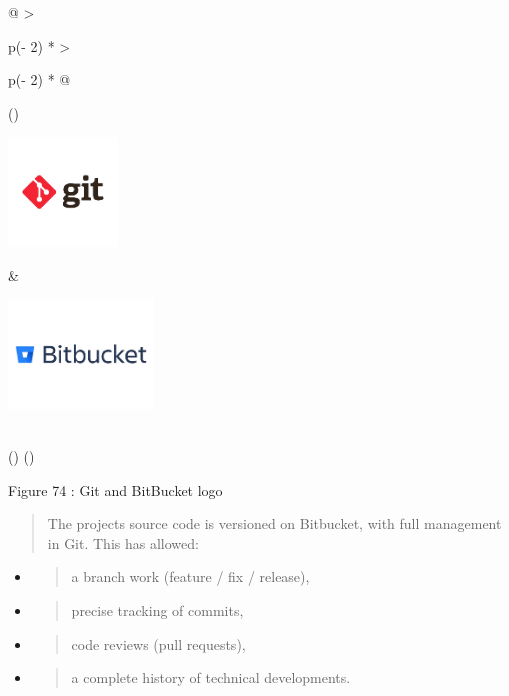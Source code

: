 \documentclass[12pt,a4paper]{report}
\begin{document}
\begin{longtable}[]{@{}
  >{\raggedright\arraybackslash}p{(\columnwidth - 2\tabcolsep) * }
  >{\raggedright\arraybackslash}p{(\columnwidth - 2\tabcolsep) * }@{}}
\toprule()
\begin{minipage}[b]{\linewidth}\raggedright
\includegraphics[width=1.14173in,height=1.14173in]{vertopal_d1b0b2209edd4c6aa8254f57daa0953b/media/image94.png}
\end{minipage} & \begin{minipage}[b]{\linewidth}\raggedright
\includegraphics[width=1.52143in,height=1.14173in]{vertopal_d1b0b2209edd4c6aa8254f57daa0953b/media/image95.png}
\end{minipage} \\
\midrule()
\endhead
\bottomrule()
\end{longtable}

\protect\hypertarget{_Toc201954550}{}{}Figure 74 : Git and BitBucket
logo

\begin{quote}
The project\textquotesingle s source code is versioned on Bitbucket,
with full management in Git. This has allowed:
\end{quote}

\begin{itemize}
\item
  \begin{quote}
  a branch work (feature / fix / release),
  \end{quote}
\item
  \begin{quote}
  precise tracking of commits,
  \end{quote}
\item
  \begin{quote}
  code reviews (pull requests),
  \end{quote}
\item
  \begin{quote}
  a complete history of technical developments.
  \end{quote}
\end{itemize}
\end{document}
